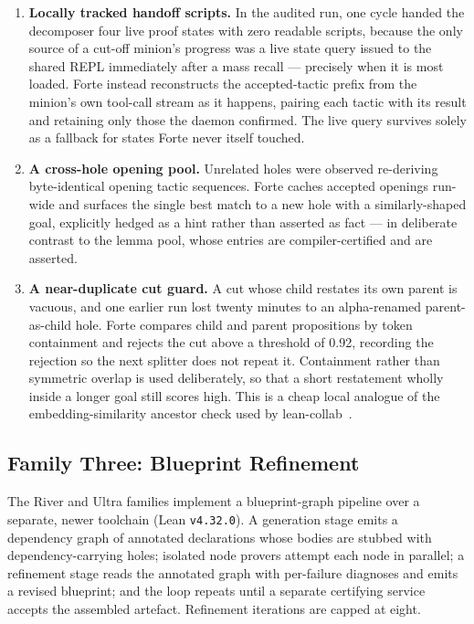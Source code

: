 \documentclass[12pt, a4paper]{article}
\begin{document}
\begin{enumerate}[leftmargin=*]
  \item \textbf{Locally tracked handoff scripts.} In the audited run, one
    cycle handed the decomposer four live proof states with zero readable
    scripts, because the only source of a cut-off minion's progress was a
    live state query issued to the shared REPL immediately after a mass
    recall --- precisely when it is most loaded. Forte instead reconstructs
    the accepted-tactic prefix from the minion's own tool-call stream as it
    happens, pairing each tactic with its result and retaining only those the
    daemon confirmed. The live query survives solely as a fallback for states
    Forte never itself touched.
  \item \textbf{A cross-hole opening pool.} Unrelated holes were observed
    re-deriving byte-identical opening tactic sequences. Forte caches
    accepted openings run-wide and surfaces the single best match to a new
    hole with a similarly-shaped goal, explicitly hedged as a hint rather
    than asserted as fact --- in deliberate contrast to the lemma pool, whose
    entries are compiler-certified and are asserted.
  \item \textbf{A near-duplicate cut guard.} A cut whose child restates its
    own parent is vacuous, and one earlier run lost twenty minutes to an
    alpha-renamed parent-as-child hole. Forte compares child and parent
    propositions by token containment and rejects the cut above a threshold
    of 0.92, recording the rejection so the next splitter does not repeat it.
    Containment rather than symmetric overlap is used deliberately, so that a
    short restatement wholly inside a longer goal still scores high. This is
    a cheap local analogue of the embedding-similarity ancestor check used by
    lean-collab~\cite{leancollab2026}.
\end{enumerate}

\subsection{Family Three: Blueprint Refinement}
\label{sec:architect}

The River and Ultra families implement a blueprint-graph pipeline over a
separate, newer toolchain (Lean \texttt{v4.32.0}). A generation stage emits a
dependency graph of annotated declarations whose bodies are stubbed with
dependency-carrying holes; isolated node provers attempt each node in
parallel; a refinement stage reads the annotated graph with per-failure
diagnoses and emits a revised blueprint; and the loop repeats until a
separate certifying service accepts the assembled artefact. Refinement
iterations are capped at eight.
\end{document}
